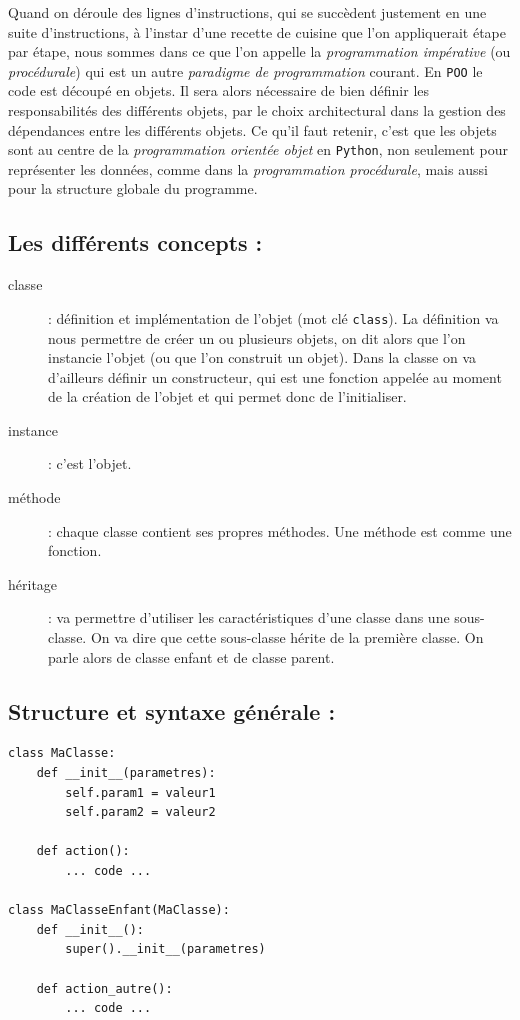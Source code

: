 \documentclass[a4paper,12pt]{book}
\begin{document}
Quand on déroule des lignes d'instructions, qui se succèdent justement en une suite d'instructions, à l'instar d'une recette de cuisine que l'on appliquerait étape par étape, nous sommes dans ce que l'on appelle la \textit{programmation impérative} (ou \textit{procédurale}) qui est un autre \textit{paradigme de programmation} courant. En \texttt{POO} le code est découpé en objets. Il sera alors nécessaire de bien définir les responsabilités  des différents objets, par le choix architectural dans la gestion des dépendances entre les différents objets. Ce qu'il faut retenir, c'est que les objets sont au centre de la \textit{programmation orientée objet} en \texttt{Python}, non seulement pour représenter les données, comme dans la \textit{programmation procédurale}, mais aussi pour la structure globale du programme.
\medskip

\subsection*{Les différents concepts :}
\begin{description}
	\item[classe] : définition et implémentation de l'objet (mot clé \texttt{class}). La définition va nous permettre de créer un ou plusieurs objets, on dit alors que l'on instancie l'objet (ou que l'on construit un objet). Dans la classe on va d'ailleurs définir un constructeur, qui est une fonction appelée au moment de la création de l'objet et qui permet donc de l'initialiser.
	\item[instance] : c'est l'objet.
	\item[méthode] : chaque classe contient ses propres méthodes. Une méthode est comme une fonction.
	\item[héritage] : va permettre d'utiliser les caractéristiques d'une classe dans une sous-classe. On va dire que cette sous-classe hérite de la première classe. On parle alors de classe enfant et de classe parent.
\end{description}
\medskip

\subsection*{Structure et syntaxe générale :}
\begin{lstlisting}[caption=Syntaxe générale]
class MaClasse:
    def __init__(parametres):
        self.param1 = valeur1
        self.param2 = valeur2

    def action():
        ... code ...

class MaClasseEnfant(MaClasse):
    def __init__():
        super().__init__(parametres)
    
    def action_autre():
        ... code ...
\end{lstlisting}
\medskip
\end{document}
